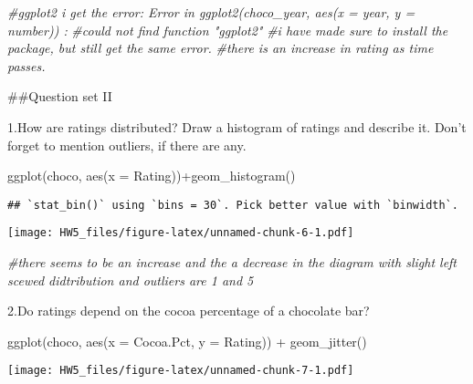 \documentclass[
]{article}
\newenvironment{Shaded}{\begin{snugshade}}{\end{snugshade}}
\newcommand{\AttributeTok}[1]{\textcolor[rgb]{0.77,0.63,0.00}{#1}}
\newcommand{\CommentTok}[1]{\textcolor[rgb]{0.56,0.35,0.01}{\textit{#1}}}
\newcommand{\FunctionTok}[1]{\textcolor[rgb]{0.00,0.00,0.00}{#1}}
\newcommand{\NormalTok}[1]{#1}
\newcommand{\SpecialCharTok}[1]{\textcolor[rgb]{0.00,0.00,0.00}{#1}}
\begin{document}
\begin{Shaded}
\begin{Highlighting}[]
\CommentTok{\#ggplot2 i get the error: Error in ggplot2(choco\_year, aes(x = year, y = number)) : }
  \CommentTok{\#could not find function "ggplot2"}
  \CommentTok{\#i have made sure to install the package, but still get the same error.  }
\CommentTok{\#there is an increase in rating as time passes. }
\end{Highlighting}
\end{Shaded}

\#\#Question set II

1.How are ratings distributed? Draw a histogram of ratings and describe
it. Don't forget to mention outliers, if there are any.

\begin{Shaded}
\begin{Highlighting}[]
\FunctionTok{ggplot}\NormalTok{(choco, }\FunctionTok{aes}\NormalTok{(}\AttributeTok{x =}\NormalTok{ Rating))}\SpecialCharTok{+}\FunctionTok{geom\_histogram}\NormalTok{()}
\end{Highlighting}
\end{Shaded}

\begin{verbatim}
## `stat_bin()` using `bins = 30`. Pick better value with `binwidth`.
\end{verbatim}

\texttt{[image: HW5\_files/figure-latex/unnamed-chunk-6-1.pdf]}

\begin{Shaded}
\begin{Highlighting}[]
  \CommentTok{\#there seems to be an increase and the a decrease in the diagram with slight left scewed didtribution and outliers are 1 and 5 }
\end{Highlighting}
\end{Shaded}

2.Do ratings depend on the cocoa percentage of a chocolate bar?

\begin{Shaded}
\begin{Highlighting}[]
\FunctionTok{ggplot}\NormalTok{(choco, }\FunctionTok{aes}\NormalTok{(}\AttributeTok{x =}\NormalTok{ Cocoa.Pct, }\AttributeTok{y =}\NormalTok{ Rating)) }\SpecialCharTok{+} \FunctionTok{geom\_jitter}\NormalTok{()}
\end{Highlighting}
\end{Shaded}

\texttt{[image: HW5\_files/figure-latex/unnamed-chunk-7-1.pdf]}
\end{document}
